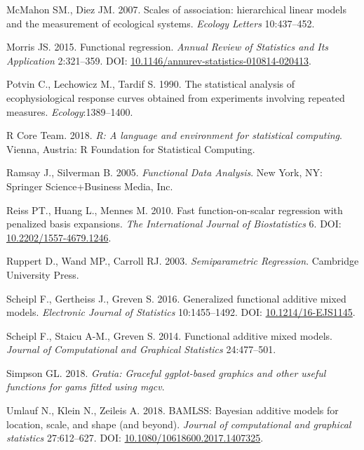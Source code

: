 \documentclass[12pt]{article}
\begin{document}
\hypertarget{ref-McMahon:2007ju}{}
McMahon SM., Diez JM. 2007. Scales of association: hierarchical linear
models and the measurement of ecological systems. \emph{Ecology Letters}
10:437--452.

\hypertarget{ref-morris_functional_2015}{}
Morris JS. 2015. Functional regression. \emph{Annual Review of
Statistics and Its Application} 2:321--359. DOI:
\href{https://doi.org/10.1146/annurev-statistics-010814-020413}{10.1146/annurev-statistics-010814-020413}.

\hypertarget{ref-potvin_statistical_1990}{}
Potvin C., Lechowicz M., Tardif S. 1990. The statistical analysis of
ecophysiological response curves obtained from experiments involving
repeated measures. \emph{Ecology}:1389--1400.

\hypertarget{ref-r_core_2018}{}
R Core Team. 2018. \emph{R: A language and environment for statistical
computing}. Vienna, Austria: R Foundation for Statistical Computing.

\hypertarget{ref-ramsay_functional_2005}{}
Ramsay J., Silverman B. 2005. \emph{Functional Data Analysis}. New York,
NY: Springer Science+Business Media, Inc.

\hypertarget{ref-reiss_fast_2010}{}
Reiss PT., Huang L., Mennes M. 2010. Fast function-on-scalar regression
with penalized basis expansions. \emph{The International Journal of
Biostatistics} 6. DOI:
\href{https://doi.org/10.2202/1557-4679.1246}{10.2202/1557-4679.1246}.

\hypertarget{ref-Ruppert:2003uc}{}
Ruppert D., Wand MP., Carroll RJ. 2003. \emph{Semiparametric
Regression}. Cambridge University Press.

\hypertarget{ref-scheipl_generalized_2016}{}
Scheipl F., Gertheiss J., Greven S. 2016. Generalized functional
additive mixed models. \emph{Electronic Journal of Statistics}
10:1455--1492. DOI:
\href{https://doi.org/10.1214/16-EJS1145}{10.1214/16-EJS1145}.

\hypertarget{ref-scheipl_functional_2014}{}
Scheipl F., Staicu A-M., Greven S. 2014. Functional additive mixed
models. \emph{Journal of Computational and Graphical Statistics}
24:477--501.

\hypertarget{ref-simpson_gratia_2018}{}
Simpson GL. 2018. \emph{Gratia: Graceful ggplot-based graphics and other
useful functions for gams fitted using mgcv}.

\hypertarget{ref-umlauf_bamlss_2018}{}
Umlauf N., Klein N., Zeileis A. 2018. BAMLSS: Bayesian additive models
for location, scale, and shape (and beyond). \emph{Journal of
computational and graphical statistics} 27:612--627. DOI:
\href{https://doi.org/10.1080/10618600.2017.1407325}{10.1080/10618600.2017.1407325}.
\end{document}
